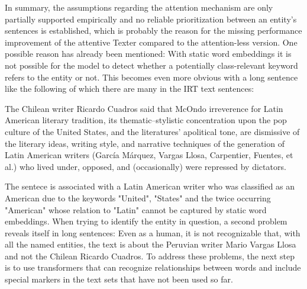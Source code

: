 In summary, the assumptions regarding the attention mechanism are only partially supported empirically and no reliable prioritization between an entity's sentences is established, which is probably the reason for the missing performance improvement of the attentive Texter compared to the attention-less version. One possible reason has already been mentioned: With static word embeddings it is not possible for the model to detect whether a potentially class-relevant keyword refers to the entity or not. This becomes even more obvious with a long sentence like the following of which there are many in the IRT text sentences:

\begin{displayquote}
    The Chilean writer Ricardo Cuadros said that McOndo irreverence for Latin American literary tradition, its thematic–stylistic concentration upon the pop culture of the United States, and the literatures’ apolitical tone, are dismissive of the literary ideas, writing style, and narrative techniques of the generation of Latin American writers (García Márquez, Vargas Llosa, Carpentier, Fuentes, et al.) who lived under, opposed, and (occasionally) were repressed by dictators.
\end{displayquote}

The sentece is associated with a Latin American writer who was classified as an American due to the keywords "United", "States" and the twice occurring "American" whose relation to "Latin" cannot be captured by static word embeddings. When trying to identify the entity in question, a second problem reveals itself in long sentences: Even as a human, it is not recognizable that, with all the named entities, the text is about the Peruvian writer Mario Vargas Llosa and not the Chilean Ricardo Cuadros. To address these problems, the next step is to use transformers that can recognize relationships between words and include special markers in the text sets that have not been used so far.
